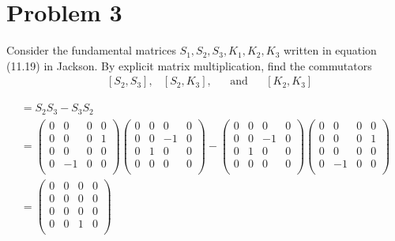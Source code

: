 \documentclass[11pt]{article}
\begin{document}
\clearpage

\section*{Problem 3}
Consider the fundamental matrices $S_{1}, S_{2}, S_{3}, K_{1}, K_{2}, K_{3}$ written in equation (11.19) in Jackson. By explicit matrix multiplication, find the commutators 
\begin{align*}
    & [S_{2}, S_{3}], & [S_{2}, K_{3}], && \text{and} && [K_{2}, K_{3}]
\end{align*}

\begin{gather*}
    [S_{2}, S_{3}] = S_{2}S_{3} - S_{3}S_{2} \\
    =
    \begin{pmatrix}
    0 & 0 & 0 & 0 \\
    0 & 0 & 0 & 1 \\
    0 & 0 & 0 & 0\\
    0 & -1 & 0 & 0 \\
    \end{pmatrix} 
    \begin{pmatrix}
    0 & 0 & 0 & 0 \\
    0 & 0 & -1 & 0 \\
    0 & 1 & 0 & 0\\
    0 & 0 & 0 & 0 \\
    \end{pmatrix} 
    -
    \begin{pmatrix}
    0 & 0 & 0 & 0 \\
    0 & 0 & -1 & 0 \\
    0 & 1 & 0 & 0\\
    0 & 0 & 0 & 0 \\
    \end{pmatrix} 
    \begin{pmatrix}
    0 & 0 & 0 & 0 \\
    0 & 0 & 0 & 1 \\
    0 & 0 & 0 & 0\\
    0 & -1 & 0 & 0 \\
    \end{pmatrix} \\
    =
    \begin{pmatrix}
    0 & 0 & 0 & 0 \\
    0 & 0 & 0 & 0 \\
    0 & 0 & 0 & 0\\
    0 & 0 & 1 & 0 \\
    \end{pmatrix}

\end{gather*}
\end{document}
